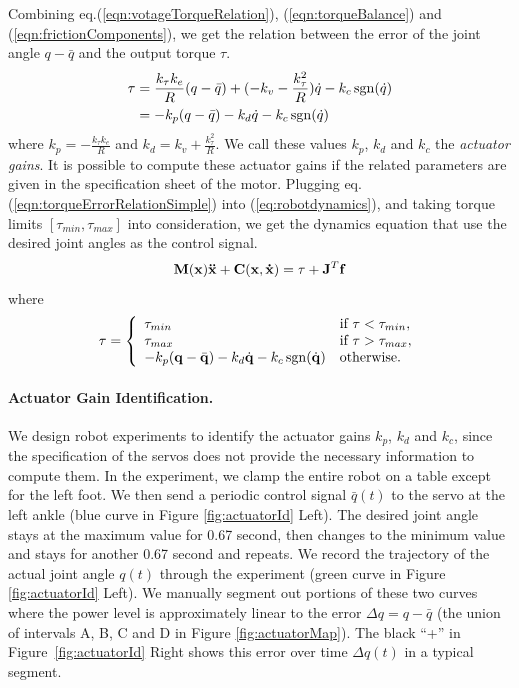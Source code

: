 Combining eq.(\ref{eqn:votageTorqueRelation}), (\ref{eqn:torqueBalance}) and (\ref{eqn:frictionComponents}), we get the relation between the error of the joint angle $q-\bar{q}$ and the output torque $\tau$.
\begin{align}
\nonumber  \tau & = \frac{k_{\tau}k_e}{R}(q-\bar{q})+(-k_v-\frac{k_{\tau}^2}{R})\dot{q}-k_c\operatorname{sgn}(\dot{q})\\
\nonumber & = -k_p(q-\bar{q}) - k_d\dot{q} - k_c\operatorname{sgn}(\dot{q})\\
  \label{eqn:torqueErrorRelationSimple}
\end{align}
where $k_p=-\frac{k_{\tau}k_e}{R}$ and $k_d=k_v+\frac{k_{\tau}^2}{R}$. We call these values $k_p$, $k_d$ and $k_c$ the \emph{actuator gains}. It is possible to compute these actuator gains if the related parameters are given in the specification sheet of the motor. Plugging eq.(\ref{eqn:torqueErrorRelationSimple}) into (\ref{eq:robotdynamics}), and taking torque limits $[\tau_{min}, \tau_{max}]$ into consideration, we get the dynamics equation that use the desired joint angles as the control signal.
\begin{displaymath}
 \mathbf{M}(\mathbf{x})\mathbf{\ddot{x}}+\mathbf{C}(\mathbf{x},\mathbf{\dot{x}}) = \tau+\mathbf{J}^T\mathbf{f} \\
  \end{displaymath}
where 
\begin{displaymath}\tau =
  \left\{
    \begin{array}{ll}
      \tau_{min} & \text{if }\tau < \tau_{min},\\
      \tau_{max} & \text{if }\tau > \tau_{max},\\
      -k_p(\mathbf{q}-\bar{\mathbf{q}}) - k_d\dot{\mathbf{q}} - k_c\operatorname{sgn}(\dot{\mathbf{q}}) & \text{otherwise.}\\
    \end{array}
  \right.
  \label{eqn:robotDynamicsControl}
\end{displaymath}

\paragraph{Actuator Gain Identification.} We design robot experiments to identify the actuator gains $k_p$, $k_d$ and $k_c$, since the specification of the servos does not provide the necessary information to compute them. In the experiment, we clamp the entire robot on a table except for the left foot. We then send a periodic control signal $\bar{q}(t)$ to the servo at the left ankle (blue curve in Figure \ref{fig:actuatorId} Left). The desired joint angle stays at the maximum value for 0.67 second, then changes to the minimum value and stays for another 0.67 second and repeats. We record the trajectory of the actual joint angle $q(t)$ through the experiment (green curve in Figure \ref{fig:actuatorId} Left). We manually segment out portions of these two curves where the power level is approximately linear to the error $\Delta q = q-\bar{q}$ (the union of intervals A, B, C and D in Figure \ref{fig:actuatorMap}). The black ``+'' in Figure~\ref{fig:actuatorId} Right shows this error over time $\Delta q(t)$ in a typical segment.

